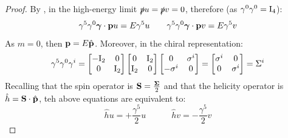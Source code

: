 \begin{proofbox}
\begin{proof}
    By , in the high-energy limit $ \slashed{p} u = \slashed{p} v = 0 $, therefore (as $ \gamma^0 \gamma^0 = \mathrm{I}_4 $):
    \begin{equation*}
      \gamma^5 \gamma^0 \boldsymbol{\gamma} \cdot \mathbf{p} u = E \gamma^5 u
      \qquad
      \gamma^5 \gamma^0 \boldsymbol{\gamma} \cdot \mathbf{p} v = E \gamma^5 v
    \end{equation*}
    As $ m = 0 $, then $ \mathbf{p} = E \hat{\mathbf{p}} $. Moreover, in the chiral representation:
    \begin{equation*}
      \gamma^5 \gamma^0 \gamma^i =
      \begin{bmatrix}
        - \mathrm{I}_2 & 0 \\
        0 & \mathrm{I}_2
      \end{bmatrix}
      \begin{bmatrix}
        0 & \mathrm{I}_2 \\
        \mathrm{I}_2 & 0
      \end{bmatrix}
      \begin{bmatrix}
        0 & \sigma^i \\
        - \sigma^i & 0
      \end{bmatrix}
      =
      \begin{bmatrix}
        \sigma^i & 0 \\
        0 & \sigma^i
      \end{bmatrix}
      = \Sigma^i
    \end{equation*}
    Recalling that the spin operator is $ \mathbf{S} = \frac{\boldsymbol{\Sigma}}{2} $ and that the helicity operator is $ \hat{h} = \mathbf{S} \cdot \hat{\mathbf{p}} $, teh above equations are equivalent to:
    \begin{equation*}
      \hat{h} u = + \frac{\gamma^5}{2} u
      \quad \qquad
      \hat{h} v = - \frac{\gamma^5}{2} v
    \end{equation*}
  \end{proof}
\end{proofbox}










